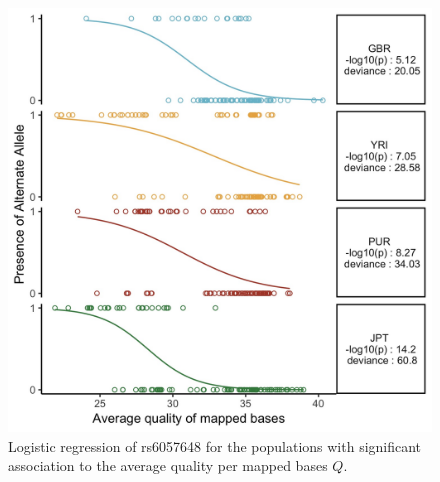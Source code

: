\documentclass[9pt,lineno]{elife}
\begin{document}

\begin{figure}[h]
\includegraphics[width=\hsize,keepaspectratio]{./Figures/RegressionPlot.jpg}
\caption{Logistic regression of rs6057648 for the populations with significant association to the average quality per mapped bases $Q$.}
\label{TwinsSNP}
\end{figure}
\end{document}
